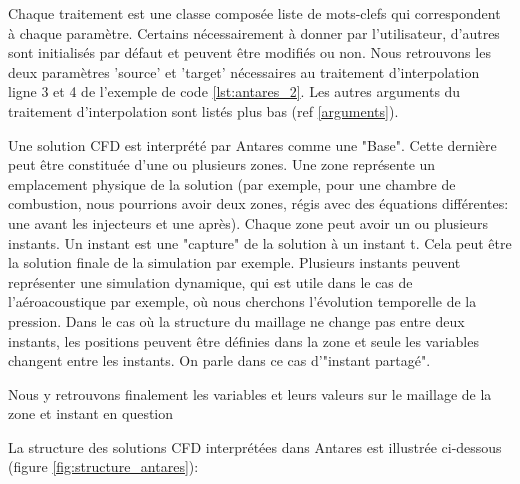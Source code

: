 Chaque traitement est une classe composée liste de mots-clefs qui correspondent à chaque paramètre. Certains nécessairement à donner par l'utilisateur, d'autres sont initialisés par défaut et peuvent être modifiés ou non. Nous retrouvons les deux paramètres 'source' et 'target' nécessaires au traitement d'interpolation ligne 3 et 4 de l'exemple de code \ref{lst:antares_2}. Les autres arguments du traitement d'interpolation sont listés plus bas (ref \ref{arguments}).


Une solution CFD est interprété par Antares comme une "Base".
Cette dernière peut être constituée d'une ou plusieurs zones.
Une zone représente un emplacement physique de la solution (par exemple, pour une chambre de combustion, nous pourrions avoir deux zones, régis avec des équations différentes: une avant les injecteurs et une après). %
Chaque zone peut avoir un ou plusieurs instants.
Un instant est une "capture" de la solution à un instant t. Cela peut être la solution finale de la simulation par exemple. Plusieurs instants peuvent représenter une simulation dynamique, qui est utile dans le cas de l'aéroacoustique par exemple, où nous cherchons l'évolution temporelle de la pression.
Dans le cas où la structure du maillage ne change pas entre deux instants, les positions peuvent être définies dans la zone et seule les variables changent entre les instants. On parle dans ce cas d'"instant partagé".\label{instants_partages}


Nous y retrouvons finalement les variables et leurs valeurs sur le maillage de la zone et instant en question


La structure des solutions CFD interprétées dans Antares est illustrée ci-dessous (figure \ref{fig:structure_antares}):

